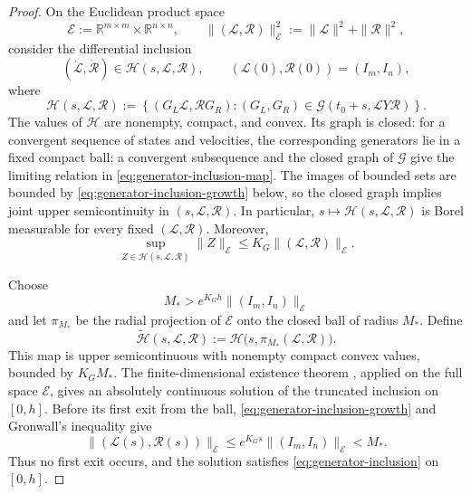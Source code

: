 \documentclass[]{article}
\numberwithin{equation}{section}
\theoremstyle{plain}
\theoremstyle{remark}
\numberwithin{algorithm}{section}
\newcommand{\R}{\mathbb{R}}
\begin{document}
\begin{proof}
On the Euclidean product space
\begin{equation}\label{eq:generator-product-space}
 \mathcal E:=\R^{m\times m}\times\R^{n\times n},
 \qquad
 \|(\mathcal L,\mathcal R)\|_{\mathcal E}^2
 :=\|\mathcal L\|^2+\|\mathcal R\|^2,
\end{equation}
consider the differential inclusion
\begin{equation}\label{eq:generator-inclusion}
 (\dot{\mathcal L},\dot{\mathcal R})
 \in\mathcal H(s,\mathcal L,\mathcal R),
 \qquad
 (\mathcal L(0),\mathcal R(0))=(I_m,I_n),
\end{equation}
where
\begin{equation}\label{eq:generator-inclusion-map}
 \mathcal H(s,\mathcal L,\mathcal R)
 :=\left\{(G_L\mathcal L,\mathcal R G_R):
 (G_L,G_R)\in
 \mathcal G(t_0+s,\mathcal L Y\mathcal R)\right\}.
\end{equation}
The values of \(\mathcal H\) are nonempty, compact, and convex.  Its graph
is closed: for a convergent sequence of states and velocities, the
corresponding generators lie in a fixed compact ball; a convergent
subsequence and the closed graph of \(\mathcal G\) give the limiting
relation in \eqref{eq:generator-inclusion-map}.  The images of bounded sets
are bounded by \eqref{eq:generator-inclusion-growth} below, so the closed
graph implies joint upper semicontinuity in
\((s,\mathcal L,\mathcal R)\).  In particular,
\(s\mapsto\mathcal H(s,\mathcal L,\mathcal R)\) is Borel measurable for
every fixed \((\mathcal L,\mathcal R)\).  Moreover,
\begin{equation}\label{eq:generator-inclusion-growth}
 \sup_{Z\in\mathcal H(s,\mathcal L,\mathcal R)}
 \|Z\|_{\mathcal E}
 \le K_G\|(\mathcal L,\mathcal R)\|_{\mathcal E}.
\end{equation}

Choose
\begin{equation}\label{eq:truncation-radius}
 M_*>e^{K_Gh}\|(I_m,I_n)\|_{\mathcal E}
\end{equation}
and let \(\pi_{M_*}\) be the radial projection of \(\mathcal E\) onto the
closed ball of radius \(M_*\).  Define
\begin{equation}\label{eq:truncated-inclusion-map}
 \widetilde{\mathcal H}(s,\mathcal L,\mathcal R)
 :=\mathcal H\bigl(s,\pi_{M_*}(\mathcal L,\mathcal R)\bigr).
\end{equation}
This map is upper semicontinuous with nonempty compact convex values,
bounded by \(K_GM_*\).  The finite-dimensional existence theorem
\cite[Theorem~5.1]{Deimling1992}, applied on the full space \(\mathcal E\),
gives an absolutely continuous solution of the truncated inclusion on
\([0,h]\).  Before
its first exit from the ball, \eqref{eq:generator-inclusion-growth} and
Gronwall's inequality give
\begin{equation}\label{eq:generator-state-bound}
 \|(\mathcal L(s),\mathcal R(s))\|_{\mathcal E}
 \le e^{K_Gs}\|(I_m,I_n)\|_{\mathcal E}<M_*.
\end{equation}
Thus no first exit occurs, and the solution satisfies
\eqref{eq:generator-inclusion} on \([0,h]\).


\end{proof}
\end{document}
